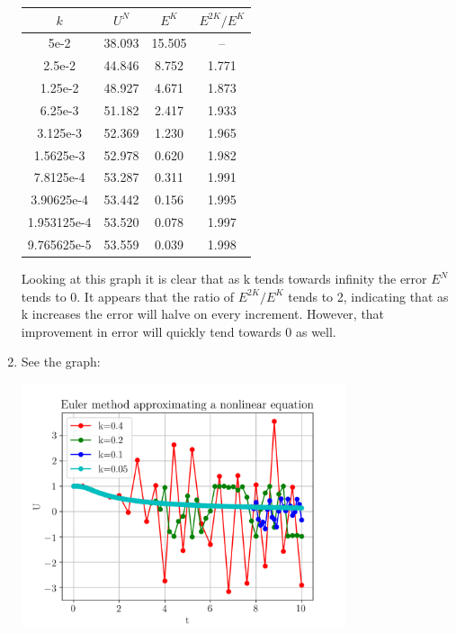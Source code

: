 \documentclass{article}
\begin{document}
\begin{enumerate}
        \begin{center}
            \begin{tabular}{| c | c | c | c |}
                \hline
                $k$ & $U^N$ & $E^K$ & $E^{2K}/E^K$ \\
                \hline
                5e-2 & 38.093 & 15.505 & -- \\
                2.5e-2 & 44.846 & 8.752 & 1.771 \\
                1.25e-2 & 48.927 & 4.671 & 1.873 \\
                6.25e-3 & 51.182 & 2.417 & 1.933 \\
                3.125e-3 & 52.369 & 1.230 & 1.965 \\
                1.5625e-3 & 52.978 & 0.620 & 1.982 \\
                7.8125e-4 & 53.287 & 0.311 & 1.991 \\
                3.90625e-4 & 53.442 & 0.156 & 1.995 \\
                1.953125e-4 & 53.520 & 0.078 & 1.997 \\
                9.765625e-5 & 53.559 & 0.039 & 1.998 \\
                \hline
            \end{tabular}
        \end{center}
        Looking at this graph it is clear that as k tends towards infinity the error $E^N$ tends to 0.
        It appears that the ratio of $E^{2K}/E^K$ tends to 2, indicating that as k increases the error will halve on every increment. However, that improvement in error will quickly tend towards 0 as well.
    \item
        See the graph: \\
        \begin{center}
            \includegraphics[width=0.75\textwidth]{q6.png}
        \end{center}
\end{enumerate}
\end{document}
